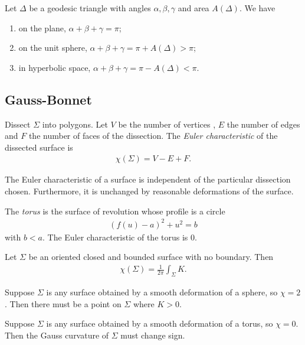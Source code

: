 \documentclass{article}
\begin{document}
\begin{corollary}[Notes 15.4]
	Let $\Delta$ be a geodesic triangle with angles $\alpha,\beta,\gamma$ and area $A(\Delta)$.
	We have
	\begin{enumerate}
		\item on the plane, $\alpha+\beta+\gamma = \pi$;
		\item on the unit sphere, $\alpha + \beta + \gamma = \pi + A(\Delta) > \pi$;
		\item in hyperbolic space, $\alpha + \beta + \gamma = \pi - A(\Delta) < \pi$.
	\end{enumerate}
\end{corollary}

\subsection{Gauss-Bonnet}

\begin{definition}
	Dissect $\Sigma$ into polygons. Let $V$ be the number of vertices , $E$ the number of edges
	and $F$ the number of faces of the dissection. The \emph{Euler characteristic} of the
	dissected surface is
	\begin{align*}
		\chi(\Sigma) = V - E + F.
	\end{align*}
\end{definition}

\begin{proposition}[Notes 15.8]
	The Euler characteristic of a surface is independent of the particular dissection chosen.
	Furthermore, it is unchanged by reasonable deformations of the surface.
\end{proposition}

\begin{definition}
	The \emph{torus} is the surface of revolution whose profile is a circle
	\begin{align*}
		(f(u)-a)^2 + u^2 = b
	\end{align*}
	with $b<a$. The Euler characteristic of the torus is $0$.
\end{definition}

\begin{theorem}
	Let $\Sigma$ be an oriented closed and bounded surface with no boundary. Then
	\begin{align*}
		\chi(\Sigma) = \frac{1}{2\pi}\int_\Sigma K.
	\end{align*}
\end{theorem}

\begin{corollary}[Notes 15.15]
	Suppose $\Sigma$ is any surface obtained by a smooth deformation of a sphere,
	so $\chi=2$. Then there must be a point on $\Sigma$ where $K>0$.
\end{corollary}

\begin{corollary}[Notes 15.16]
	Suppose $\Sigma$ is any surface obtained by a smooth deformation of a torus,
	so $\chi=0$. Then the Gauss curvature of $\Sigma$ must change sign.
\end{corollary}
\end{document}
